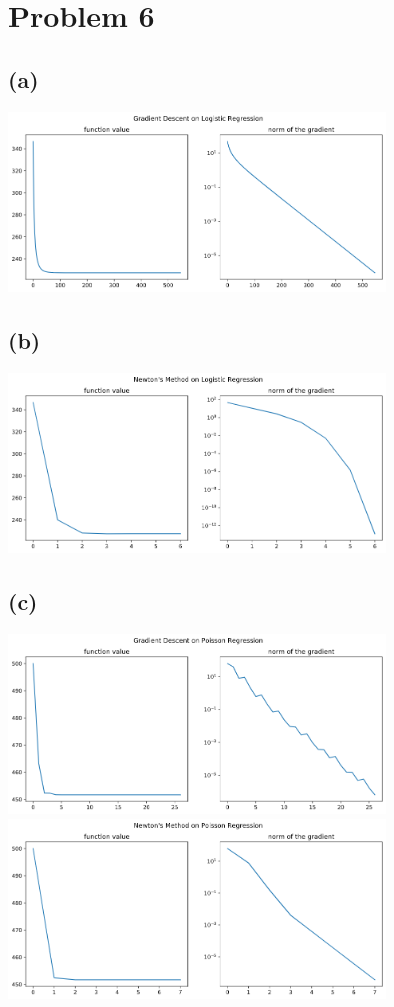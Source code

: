 \documentclass[]{article}
\begin{document}
\section*{Problem 6}
    \subsection*{(a)}
        \includegraphics*[width=10cm]{gradient-logistic.png}
    \subsection*{(b)}
        \includegraphics*[width=10cm]{newton-logistic.png}
    \subsection*{(c)}
        \includegraphics*[width=10cm]{gradient-poisson.png}\\
        \includegraphics*[width=10cm]{newton-poisson.png}
\end{document}
